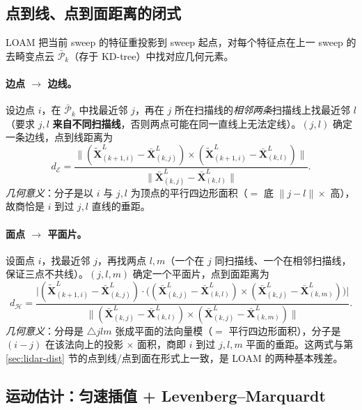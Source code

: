 \subsection{点到线、点到面距离的闭式}
\label{sec:lidar-loam-dist}

LOAM 把当前 sweep 的特征重投影到 sweep 起点，对每个特征点在上一 sweep 的去畸变点云 $\bar{\mathcal{P}}_k$（存于 KD-tree）中找对应几何元素\cite{zhang2014loam}。

\paragraph{边点 $\to$ 边线。}
设边点 $i$，在 $\bar{\mathcal{P}}_k$ 中找最近邻 $j$，再在 $j$ 所在扫描线的\emph{相邻两条}扫描线上找最近邻 $l$（要求 $j,l$ \textbf{来自不同扫描线}，否则两点可能在同一直线上无法定线）。$(j,l)$ 确定一条边线，点到线距离为
\begin{equation}
  d_{\mathcal{E}}=\frac{\big\|(\tilde{\mathbf{X}}^L_{(k+1,i)}-\bar{\mathbf{X}}^L_{(k,j)})\times(\tilde{\mathbf{X}}^L_{(k+1,i)}-\bar{\mathbf{X}}^L_{(k,l)})\big\|}{\big\|\bar{\mathbf{X}}^L_{(k,j)}-\bar{\mathbf{X}}^L_{(k,l)}\big\|}.
  \label{eq:lidar-loam-de}
\end{equation}
\emph{几何意义}：分子是以 $i$ 与 $j,l$ 为顶点的平行四边形面积（$=$ 底 $\|j-l\|\times$ 高），故商恰是 $i$ 到过 $j,l$ 直线的垂距。

\paragraph{面点 $\to$ 平面片。}
设面点 $i$，找最近邻 $j$，再找两点 $l,m$（一个在 $j$ 同扫描线、一个在相邻扫描线，保证三点不共线）。$(j,l,m)$ 确定一个平面片，点到面距离为
\begin{equation}
  d_{\mathcal{H}}=\frac{\big|(\tilde{\mathbf{X}}^L_{(k+1,i)}-\bar{\mathbf{X}}^L_{(k,j)})\cdot\big((\bar{\mathbf{X}}^L_{(k,j)}-\bar{\mathbf{X}}^L_{(k,l)})\times(\bar{\mathbf{X}}^L_{(k,j)}-\bar{\mathbf{X}}^L_{(k,m)})\big)\big|}{\big\|(\bar{\mathbf{X}}^L_{(k,j)}-\bar{\mathbf{X}}^L_{(k,l)})\times(\bar{\mathbf{X}}^L_{(k,j)}-\bar{\mathbf{X}}^L_{(k,m)})\big\|}.
  \label{eq:lidar-loam-dh}
\end{equation}
\emph{几何意义}：分母是 $\triangle jlm$ 张成平面的法向量模（$=$ 平行四边形面积），分子是 $(i-j)$ 在该法向上的投影 $\times$ 面积，商即 $i$ 到过 $j,l,m$ 平面的垂距。这两式与第 \ref{sec:lidar-dist} 节的点到线/点到面在形式上一致，是 LOAM 的两种基本残差。

\subsection{运动估计：匀速插值 + Levenberg–Marquardt}
\label{sec:lidar-loam-motion}

